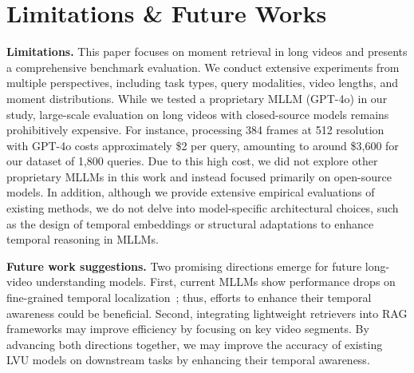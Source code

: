 \documentclass{article}
\begin{document}
\section{Limitations \& Future Works}\label{sec:limitation}

\textbf{Limitations.} This paper focuses on moment retrieval in long videos and presents a comprehensive benchmark evaluation. We conduct extensive experiments from multiple perspectives, including task types, query modalities, video lengths, and moment distributions. While we tested a proprietary MLLM (GPT-4o) in our study, large-scale evaluation on long videos with closed-source models remains prohibitively expensive. For instance, processing 384 frames at 512 resolution with GPT-4o costs approximately \$2 per query, amounting to around \$3,600 for our dataset of 1,800 queries. Due to this high cost, we did not explore other proprietary MLLMs in this work and instead focused primarily on open-source models. In addition, although we provide extensive empirical evaluations of existing methods, we do not delve into model-specific architectural choices, such as the design of temporal embeddings or structural adaptations to enhance temporal reasoning in MLLMs.


\textbf{Future work suggestions.} Two promising directions emerge for future long-video understanding models. First, current MLLMs show performance drops on fine-grained temporal localization~\cite{fu2024videomme,zhou2025mlvu}; thus, efforts to enhance their temporal awareness could be beneficial. Second, integrating lightweight retrievers into RAG frameworks may improve efficiency by focusing on key video segments. By advancing both directions together, we may improve the accuracy of existing LVU models on downstream tasks by enhancing their temporal awareness.
\end{document}

